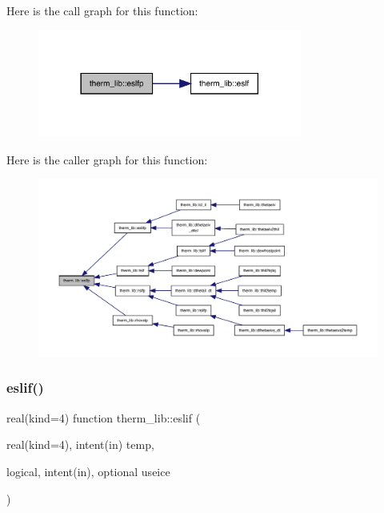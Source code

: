 Here is the call graph for this function\+:
\nopagebreak
\begin{figure}[H]
\begin{center}
\leavevmode
\includegraphics[width=246pt]{namespacetherm__lib_a4339cfce3e15e3410bcc7ba6a7d6ba06_cgraph}
\end{center}
\end{figure}
Here is the caller graph for this function\+:
\nopagebreak
\begin{figure}[H]
\begin{center}
\leavevmode
\includegraphics[width=350pt]{namespacetherm__lib_a4339cfce3e15e3410bcc7ba6a7d6ba06_icgraph}
\end{center}
\end{figure}
\mbox{\label{namespacetherm__lib_a5cebdf07920a9af5a0cbc49bafbc30b4}} 
\subsubsection{\texorpdfstring{eslif()}{eslif()}}
{\footnotesize\ttfamily real(kind=4) function therm\+\_\+lib\+::eslif (\begin{DoxyParamCaption}\item[{real(kind=4), intent(in)}]{temp,  }\item[{logical, intent(in), optional}]{useice }\end{DoxyParamCaption})}

